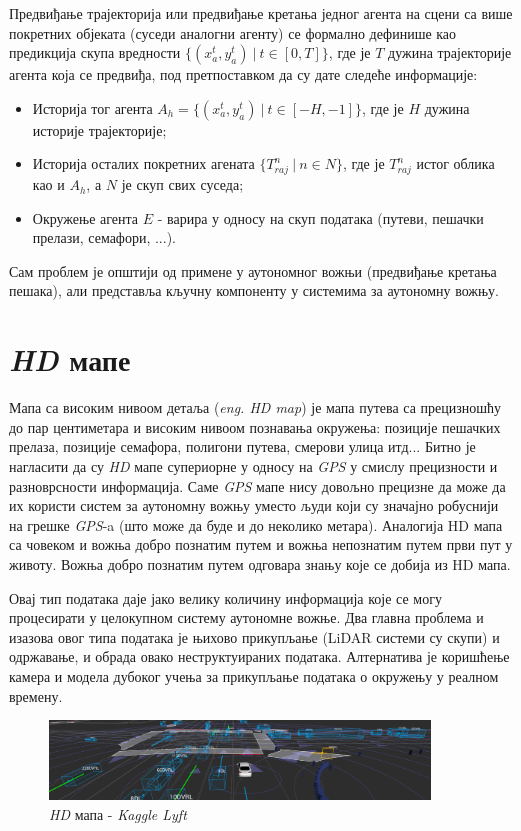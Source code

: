 \documentclass[11pt,oneside]{memoir}
\begin{document}
Предвиђање трајекторија или предвиђање кретања једног агента на сцени са више покретних објеката (суседи аналогни агенту) се формално
дефинише као предикција скупа вредности $\{(x^{t}_a, y^{t}_a)\ |\ t \in [0, T]\}$, где је $T$ дужина трајекторије агента која се предвиђа, 
под претпоставком да су дате следеће информације:
\begin{itemize}
  \item Историја тог агента $A_{h} = \{(x^{t}_a, y^{t}_a)\ |\ t \in [-H, -1]\}$, где је $H$ дужина историје трајекторије;
  \item Историја осталих покретних агената $\{T^{n}_{raj}\ |\ n \in N\}$, где је $T^{n}_{raj}$ истог облика као и $A_{h}$, а $N$ је скуп
        свих суседа;
  \item Окружење агента $E$ - варира у односу на скуп података (путеви, пешачки прелази, семафори, ...).
\end{itemize}

Сам проблем је општији од примене у аутономног вожњи (предвиђање кретања пешака), али представља кључну компоненту у системима за
аутономну вожњу.

\section{\textit{HD} мапе}

Мапа са високим нивоом детаља (\textit{eng. HD map}) је мапа путева са прецизношћу до пар центиметара и високим нивоом
познавања окружења: позиције пешачких прелаза, позиције семафора, полигони путева, смерови улица итд... Битно је нагласити
да су \textit{HD} мапе супериорне у односу на \textit{GPS} у смислу прецизности и разноврсности информација. Саме \textit{GPS}
мапе нису довољно прецизне да може да их користи систем за аутономну вожњу уместо људи који су значајно робуснији на грешке
\textit{GPS}-a (што може да буде и до неколико метара). Аналогија HD мапа са човеком и вожња добро познатим путем и вожња 
непознатим путем први пут у животу. Вожња добро познатим путем одговара знању које се добија из HD мапа. 


Овај тип података даје јако велику количину информација које се могу процесирати у целокупном систему аутономне вожње. Два главна проблема
и изазова овог типа података је њихово прикупљање (LiDAR системи су скупи) и одржавање, и обрада овако неструктуираних података. Алтернатива
је коришћење камера и модела дубоког учења за прикупљање података о окружењу у реалном времену.

\begin{figure}[H]
  \centering
  \includegraphics[width=0.9\textwidth]{images/lyft-hd-map.png}
  \caption{\textit{HD} мапа - \textit{Kaggle Lyft} \cite{kaggle_lyft} \label{kaggle-lyft-example}}
\end{figure}
\end{document}

